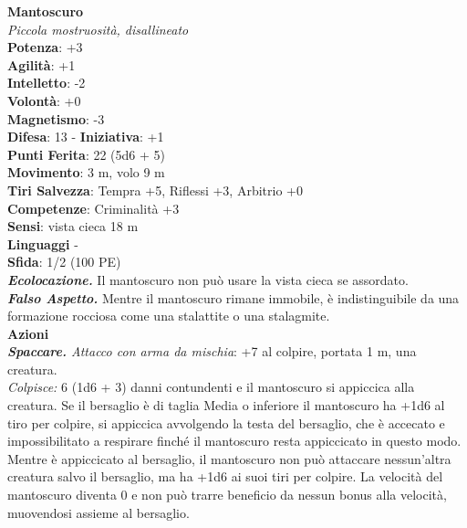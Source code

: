 \begin{multicols}{2}
\medskip\textbf{Mantoscuro}\\
\emph{Piccola mostruosità, disallineato}\\
\textbf{Potenza}: +3\\
\textbf{Agilità}: +1\\
\textbf{Intelletto}: -2\\
\textbf{Volontà}: +0\\
\textbf{Magnetismo}: -3\\
\textbf{Difesa}: 13 - \textbf{Iniziativa}: +1\\
\textbf{Punti Ferita}: 22 (5d6 + 5)\\
\textbf{Movimento}: 3 m, volo 9 m\\
\textbf{Tiri Salvezza}: Tempra +5, Riflessi +3, Arbitrio +0\\
\textbf{Competenze}: Criminalità +3\\
\textbf{Sensi}: vista cieca 18 m\\
\textbf{Linguaggi} -\\
\textbf{Sfida}: 1/2 (100 PE)\smallskip\\
\emph{\textbf{Ecolocazione.}} Il mantoscuro non può usare la vista cieca se assordato.\\
\emph{\textbf{Falso Aspetto.}} Mentre il mantoscuro rimane immobile, è indistinguibile da una formazione rocciosa come una stalattite o una stalagmite.\\
\smallskip\textbf{Azioni}\\
\emph{\textbf{Spaccare.} Attacco con arma da mischia}: +7 al colpire, portata 1 m, una creatura.\\
\emph{Colpisce:} 6 (1d6 + 3) danni contundenti e il mantoscuro si appiccica alla creatura. Se il bersaglio è di taglia Media o inferiore il mantoscuro ha +1d6 al tiro per colpire, si appiccica avvolgendo la testa del bersaglio, che è accecato e impossibilitato a respirare finché il mantoscuro resta appiccicato in questo modo. \\
Mentre è appiccicato al bersaglio, il mantoscuro non può attaccare nessun'altra creatura salvo il bersaglio, ma ha +1d6 ai suoi tiri per colpire. La velocità del mantoscuro diventa 0 e non può trarre beneficio da nessun bonus alla velocità, muovendosi assieme al bersaglio.\\


\end{multicols}
